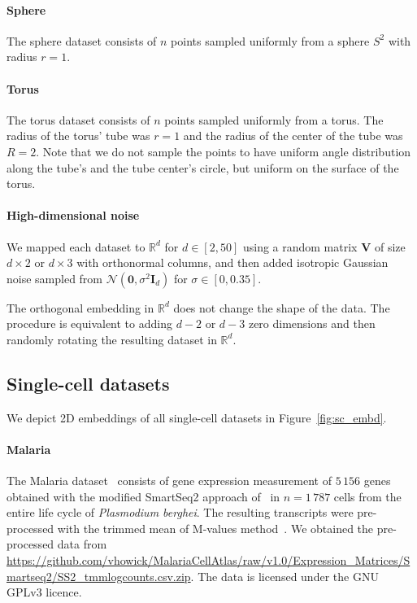 \documentclass{article}
\theoremstyle{plain}
\theoremstyle{definition}
\theoremstyle{remark}
\begin{document}
\paragraph{Sphere}
The sphere dataset consists of $n$ points sampled uniformly from a sphere $S^2$ with radius $r=1$.

\paragraph{Torus}
The torus dataset consists of $n$ points sampled uniformly from a torus. The radius of the torus' tube was $r=1$ and the radius of the center of the tube was $R=2$. Note that we do not sample the points to have uniform angle distribution along the tube's and the tube center's circle, but uniform on the surface of the torus.


\paragraph{High-dimensional noise}
We mapped each dataset to $\mathbb{R}^d$ for $d\in[2, 50]$ using a random matrix $\mathbf V$ of size $d\times 2$ or $d\times 3$ with orthonormal columns, and then added isotropic Gaussian noise sampled from $\mathcal{N}(\mathbf 0, \sigma^2 \mathbf I_d)$ for $\sigma \in [0, 0.35]$. 

The orthogonal embedding in $\mathbb R^d$ does not change the shape of the data. The procedure is equivalent to adding $d-2$ or $d-3$ zero dimensions and then randomly rotating the resulting dataset in $\mathbb R^d$.


\subsection{Single-cell datasets}
We depict 2D embeddings of all single-cell datasets in Figure~\ref{fig:sc_embd}.


\paragraph{Malaria}
The Malaria dataset~\citep{howick2019malaria} consists of gene expression measurement of $5\,156$ genes obtained with the modified SmartSeq2 approach of~\citet{reid2018single} in \mbox{$n=1\,787$} cells from the entire life cycle of \textit{Plasmodium berghei}. The resulting transcripts were pre-processed with the trimmed mean of M-values method~\citep{robinson2010scaling}. We obtained the pre-processed data from \url{https://github.com/vhowick/MalariaCellAtlas/raw/v1.0/Expression_Matrices/Smartseq2/SS2_tmmlogcounts.csv.zip}. The data is licensed under the GNU GPLv3 licence.
\end{document}
